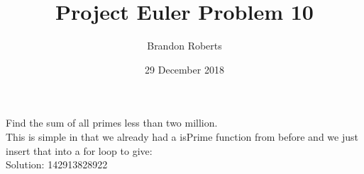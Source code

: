 \documentclass{article}
\begin{document}
\title{Project Euler Problem 10}
\author{Brandon Roberts}
\date{29 December 2018}

\maketitle

Find the sum of all primes less than two million.\\
This is simple in that we already had a isPrime function from before and we just insert that into a for loop to give:\\
Solution: 142913828922
\end{document}

